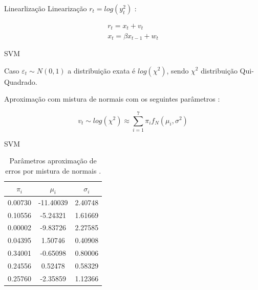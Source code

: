 \documentclass{beamer}
\begin{document}
\begin{frame}{Linearlização}
Linearização  $r_t = log(y_t^2)$  \citep{Kim1998}:


\begin{eqnarray}
r_t = x_t + v_t  \nonumber \\
x_t = \beta x_{t-1} + w_t
\label{eq:svm_basico}
\end{eqnarray}


\end{frame}



\begin{frame}{SVM}


Caso $\varepsilon_t \sim N(0,1)$ a distribuição exata é $log(\chi^2)$, sendo $\chi^2$ distribuição Qui-Quadrado. 

Aproximação com mistura de normais com os seguintes parâmetros \citep{Kim1998}:

\begin{equation}
v_t \sim log(\chi^2) \approx \sum_{i=1}^7 \pi_i f_N(\mu_i,\sigma^2)
\label{eq:mixnormal}
\end{equation}

\end{frame}



\begin{frame}{SVM}

\begin{table}[ht]
\centering
\begin{tabular}{ccc}
   \hline
  \hline
$\pi_i$ & $\mu_i$ & $\sigma_i$ \\ 
  \hline
0.00730 & -11.40039 & 2.40748 \\ 
  0.10556 & -5.24321 & 1.61669 \\ 
  0.00002 & -9.83726 & 2.27585 \\ 
  0.04395 & 1.50746 & 0.40908 \\ 
  0.34001 & -0.65098 & 0.80006 \\ 
  0.24556 & 0.52478 & 0.58329 \\ 
  0.25760 & -2.35859 & 1.12366 \\ 
   \hline
      \hline
\end{tabular}
      \caption{\scriptsize{ Parâmetros aproximação de erros por mistura de normais \citep{Kim1998}.}}
\label{tab:mixnormal}
\end{table}

\end{frame}
\end{document}
